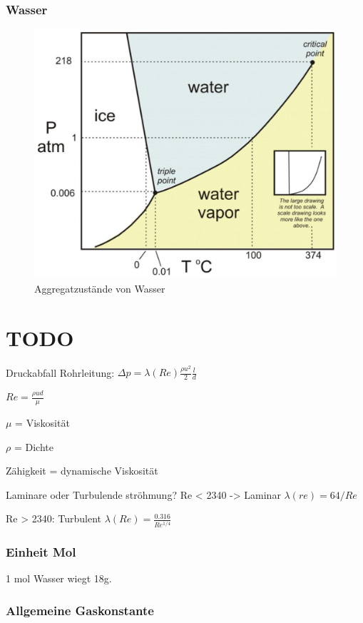 \documentclass[a4paper]{scrartcl}
\begin{document}
\subsubsection{Wasser}

\begin{figure}[h]
	\centering
	\includegraphics[width=0.7\linewidth]{img/wasser_aggregatszustaende}
	\caption{Aggregatzustände von Wasser}
	\label{fig:wasseraggregatszustaende}
\end{figure}


\section{TODO}


Druckabfall Rohrleitung: $\Delta p = \lambda(Re) \frac{\rho u^2}{2}\frac{l}{d}$

$Re = \frac{\rho u d}{\mu}$

$\mu$ = Viskosität

$\rho$ = Dichte

Zähigkeit = dynamische Viskosität


Laminare oder Turbulende ströhmung? 
Re < 2340 -> Laminar
	$\lambda(re) = 64/Re$
	
Re > 2340: Turbulent
	$\lambda(Re) = \frac{0.316}{Re^{1/4}}$

\subsubsection{Einheit Mol}

1 mol Wasser wiegt 18g.

\subsubsection{Allgemeine Gaskonstante}
\end{document}
